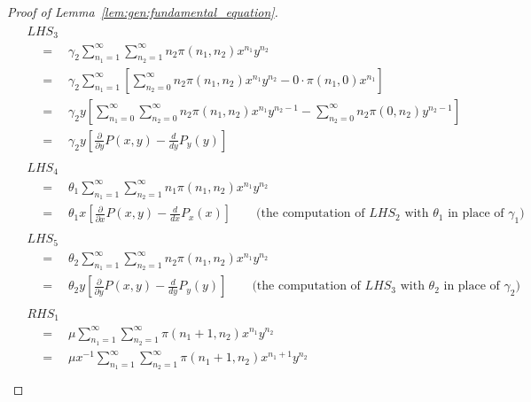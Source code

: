\begin{proof}[Proof of Lemma~\ref{lem:gen:fundamental_equation}]
\begin{align*}
        \begin{split}
            & LHS_3 \\
            & \quad = \quad \gamma_2 \sum_{n_1=1}^{\infty} \sum_{n_2=1}^{\infty} n_2 \pi(n_1,n_2) x^{n_1} y^{n_2} \\
            & \quad = \quad \gamma_2 \sum_{n_1=1}^{\infty} \left[ \sum_{n_2=0}^{\infty} n_2 \pi(n_1,n_2) x^{n_1} y^{n_2} - 0 \cdot \pi(n_1,0) x^{n_1} \right] \\
            & \quad = \quad \gamma_2 y \left[
                \sum_{n_1=0}^{\infty} \sum_{n_2=0}^{\infty} n_2 \pi(n_1,n_2) x^{n_1} y^{n_2-1}
                - \sum_{n_2=0}^{\infty} n_2 \pi(0,n_2) y^{n_2-1}
            \right] \\
            & \quad = \quad \gamma_2 y \left[
                \frac{\partial}{\partial y} P(x,y) - \frac{d}{dy} P_y(y)
            \right]
        \end{split} \\
        \begin{split}
            & LHS_4 \\
            & \quad = \quad \theta_1 \sum_{n_1=1}^{\infty} \sum_{n_2=1}^{\infty} n_1 \pi(n_1,n_2) x^{n_1} y^{n_2} \\
            & \quad = \quad \theta_1 x \left[
                \frac{\partial}{\partial x} P(x,y) - \frac{d}{dx} P_x(x)
            \right]
            \qquad \text{(the computation of $LHS_2$ with $\theta_1$ in place of $\gamma_1$)}
        \end{split} \\
        \begin{split}
            & LHS_5 \\
            & \quad = \quad \theta_2 \sum_{n_1=1}^{\infty} \sum_{n_2=1}^{\infty} n_2 \pi(n_1,n_2) x^{n_1} y^{n_2} \\
            & \quad = \quad \theta_2 y \left[
                \frac{\partial}{\partial y} P(x,y) - \frac{d}{dy} P_y(y)
            \right]
            \qquad \text{(the computation of $LHS_3$ with $\theta_2$ in place of $\gamma_2$)}
        \end{split} \\
        \begin{split}
            & RHS_1 \\
            & \quad = \quad \mu \sum_{n_1=1}^{\infty} \sum_{n_2=1}^{\infty} \pi(n_1+1, n_2) x^{n_1} y^{n_2} \\
            & \quad = \quad \mu x^{-1} \sum_{n_1=1}^{\infty} \sum_{n_2=1}^{\infty} \pi(n_1+1, n_2) x^{n_1+1} y^{n_2} \\

\end{split}
\end{align*}
\end{proof}
